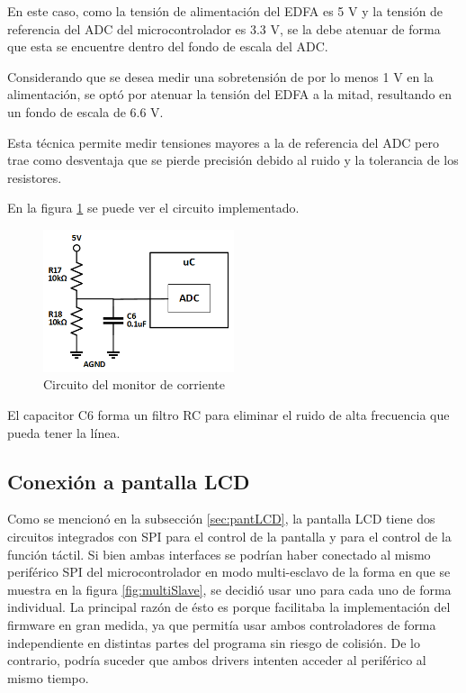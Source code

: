 En este caso, como la tensión de alimentación del EDFA es 5 V y la tensión de referencia del ADC del microcontrolador es 3.3 V, se la debe atenuar de forma que esta se encuentre dentro del fondo de escala del ADC.

Considerando que se desea medir una sobretensión de por lo menos 1 V en la alimentación, se optó por atenuar la tensión del EDFA a la mitad, resultando en un fondo de escala de 6.6 V.

Esta técnica permite medir tensiones mayores a la de referencia del ADC pero trae como desventaja que se pierde precisión debido al ruido y la tolerancia de los resistores.

En la figura \ref{fig:monTension} se puede ver el circuito implementado.

\begin{figure}[H]
\centering
\includegraphics[width=0.5\textwidth]{./Figures/mon_tension.png}
\caption{Circuito del monitor de corriente}
\label{fig:monTension}
\end{figure}

El capacitor C6 forma un filtro RC para eliminar el ruido de alta frecuencia que pueda tener la línea.

\subsection{Conexión a pantalla LCD}

Como se mencionó en la subsección \ref{sec:pantLCD}, la pantalla LCD tiene dos circuitos integrados con SPI para el control de la pantalla y para el control de la función táctil. Si bien ambas interfaces se podrían haber conectado al mismo periférico SPI del microcontrolador en modo multi-esclavo de la forma en que se muestra en la figura \ref{fig:multiSlave}, se decidió usar uno para cada uno de forma individual. La principal razón de ésto es porque facilitaba la implementación del firmware en gran medida, ya que permitía usar ambos controladores de forma independiente en distintas partes del programa sin riesgo de colisión. De lo contrario, podría suceder que ambos drivers intenten acceder al periférico al mismo tiempo.

